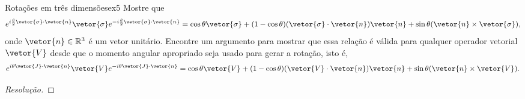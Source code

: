 \begin{exercício}{Rotações em três dimensões}{ex5}
    Mostre que
    \begin{equation*}
        e^{i\frac{\theta}{2} \vetor{\sigma} \cdot \vetor{n}} \vetor{\sigma} e^{-i\frac{\theta}{2} \vetor{\sigma} \cdot \vetor{n}} = \cos\theta \vetor{\sigma} + (1 - \cos\theta)(\vetor{\sigma} \cdot \vetor{n})\vetor{n} + \sin\theta (\vetor{n} \times \vetor{\sigma}),
    \end{equation*}
    onde \(\vetor{n} \in \mathbb{R}^3\) é um vetor unitário. Encontre um argumento para mostrar que essa relação é válida para qualquer operador vetorial \(\vetor{V}\) desde que o momento angular apropriado seja usado para gerar a rotação, isto é,
    \begin{equation*}
        e^{i\theta \vetor{J} \cdot \vetor{n}} \vetor{V} e^{-i\theta \vetor{J} \cdot \vetor{n}} = \cos\theta \vetor{V} + (1 - \cos\theta)(\vetor{V} \cdot \vetor{n})\vetor{n} + \sin\theta (\vetor{n} \times \vetor{V}).
    \end{equation*}
\end{exercício}
\begin{proof}[Resolução]
    
\end{proof}
